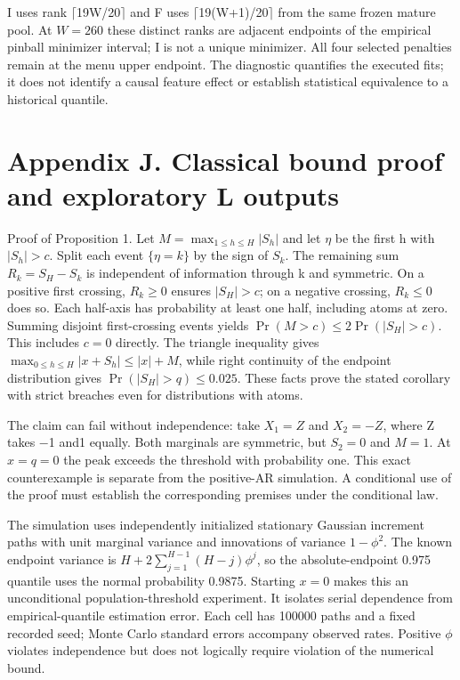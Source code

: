 \documentclass[10pt,a4paper]{article}
\begin{document}
I uses rank \(\lceil\)19W/20\(\rceil\) and F uses \(\lceil\)19(W+1)/20\(\rceil\) from the same frozen mature pool. At \(W=260\) these distinct ranks are adjacent endpoints of the empirical pinball minimizer interval; I is not a unique minimizer. All four selected penalties remain at the menu upper endpoint. The diagnostic quantifies the executed fits; it does not identify a causal feature effect or establish statistical equivalence to a historical quantile.

\section*{Appendix J. Classical bound proof and exploratory L outputs}
Proof of Proposition 1. Let \(M=\max_{1\le h\le H}|S_h|\) and let \(\eta\) be the first h with \(|S_h|>c\). Split each event \(\{\eta=k\}\) by the sign of \(S_k\). The remaining sum \(R_k=S_H-S_k\) is independent of information through k and symmetric. On a positive first crossing, \(R_k\ge0\) ensures \(|S_H|>c\); on a negative crossing, \(R_k\le0\) does so. Each half-axis has probability at least one half, including atoms at zero. Summing disjoint first-crossing events yields \(\Pr(M>c)\le2\Pr(|S_H|>c)\). This includes \(c=0\) directly. The triangle inequality gives \(\max_{0\le h\le H}|x+S_h|\le|x|+M\), while right continuity of the endpoint distribution gives \(\Pr(|S_H|>q)\le0.025\). These facts prove the stated corollary with strict breaches even for distributions with atoms.

The claim can fail without independence: take \(X_1=Z\) and \(X_2=-Z\), where Z takes \(-\)1 and1 equally. Both marginals are symmetric, but \(S_2=0\) and \(M=1\). At \(x=q=0\) the peak exceeds the threshold with probability one. This exact counterexample is separate from the positive-AR simulation. A conditional use of the proof must establish the corresponding premises under the conditional law.

The simulation uses independently initialized stationary Gaussian increment paths with unit marginal variance and innovations of variance \(1-\phi^2\). The known endpoint variance is \(H+2\sum_{j=1}^{H-1}(H-j)\phi^j\), so the absolute-endpoint 0.975 quantile uses the normal probability 0.9875. Starting \(x=0\) makes this an unconditional population-threshold experiment. It isolates serial dependence from empirical-quantile estimation error. Each cell has 100000 paths and a fixed recorded seed; Monte Carlo standard errors accompany observed rates. Positive \(\phi\) violates independence but does not logically require violation of the numerical bound.
\end{document}
